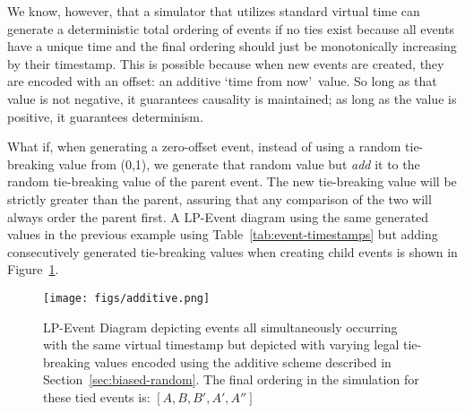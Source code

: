 \documentclass[nonacm,sigconf]{acmart}
\begin{document}
We know, however, that a simulator that utilizes standard virtual time can generate a deterministic total ordering of events if no ties exist because all events have a unique time and the final ordering should just be monotonically increasing by their timestamp. This is possible because when new events are created, they are encoded with an offset: an additive \lq time from now\rq~value. So long as that value is not negative, it guarantees causality is maintained; as long as the value is positive, it guarantees determinism.

What if, when generating a zero-offset event, instead of using a random tie-breaking value from (0,1), we generate that random value but \emph{add} it to the random tie-breaking value of the parent event. The new tie-breaking value will be strictly greater than the parent, assuring that any comparison of the two will always order the parent first. A LP-Event diagram using the same generated values in the previous example using Table~\ref{tab:event-timestamps} but adding consecutively generated tie-breaking values when creating child events is shown in Figure~\ref{fig:additive-diagram}. 

\begin{figure}[t]
  \centering
  \texttt{[image: figs/additive.png]}
  \caption{LP-Event Diagram depicting events all simultaneously occurring with the same virtual timestamp but depicted with varying legal tie-breaking values encoded using the additive scheme described in Section~\ref{sec:biased-random}. The final ordering in the simulation for these tied events is: $[A,B,B',A',A'']$}\label{fig:additive-diagram}
\end{figure}
\end{document}
